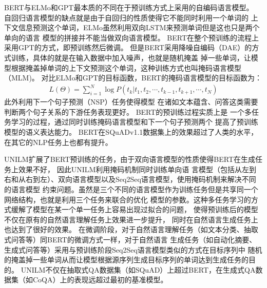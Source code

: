BERT与ELMo和GPT最本质的不同在于预训练方式上采用的自编码语言模型。
自回归语言模型的缺点就是由于自回归的性质使得它不能同时利用一个单词的
上下文信息预测这个单词，ELMo虽然利用双向LSTM来预测单词但是这也只是两个单向的语言
模型的拼接并不能当做双向语言模型。
BERT在整个预训练的流程上采用GPT的方式，即预训练然后微调。
但是BERT采用降噪自编码（DAE）的方式训练，具体的就是在输入数据中加入噪声，也就是随机掩盖
掉一些单词，让模型根据掩盖掉单词的上下文预测这个单词，这种训练方式也叫掩码语言模型（MLM)。
对比ELMo和GPT的目标函数，BERT的掩码语言模型的目标函数为：
\begin{equation}
    \begin{split}
        L(\Theta)=\sum_{i=1}^{N}\log P(t_k|t_1,t_2,\cdots,t_{k-1},t_{k+1},\cdots,t_{N})
    \end{split}
\end{equation}
此外利用下一个句子预测（NSP）任务使得模型
在诸如文本蕴含、问答这类需要判断两个句子关系的下游任务表现更好。
BERT的预训练过程实质上是
一个多任务学习的过程，通过同时训练掩码语言模型和下一个句子预测两个
提高了预训练模型的语义表达能力。
BERT在SQuADv1.1数据集上的效果超过了人类的水平，在其它的NLP任务上也都有提升。

UNILM扩展了BERT预训练的任务，由于双向语言模型的性质使得BERT在生成任务上效果不好，
因此UNILM利用掩码机制同时训练单向语
言模型（包括从左到右和从右到左）、双向语言模型以及Seq2Seq语言模型，使用掩码机制来解决不同的语言模型
约束问题。虽然是三个不同的语言模型作为训练任务但是共享同一个网络结构，也就是利用三个任务来联合的优化
模型的参数。这种多任务学习的方式缓解了模型在某一个单一任务上容易出现过拟合的问题，
使得预训练后的模型不仅在原有的自然语言理解任务上效果进一步提升，
同时在自然语言生成任务上也达到了很好的效果。
在微调阶段，对于自然语言理解任务（如文本分类、抽取式问答等）同BERT的微调方式一样，对于自然语言
生成任务（如自动化摘要、生成式问答等）采用与预训练阶段Seq2Seq语言模型类似的方式在目标序列中
随机的掩盖掉一些单词从而让模型根据源序列生成目标序列的单词达到生成任务的目的。
UNILM不仅在抽取式QA数据集（如SQuAD）上超过BERT，在生成式QA数据集（如CoQA）上的表现远超过最初的基准模型。

